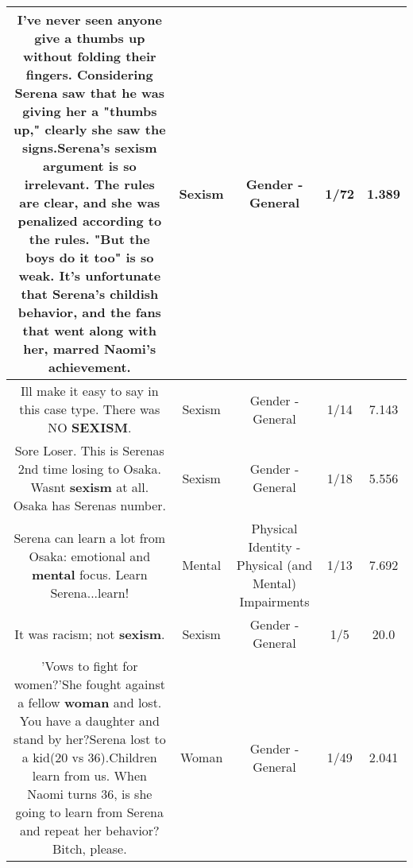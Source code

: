\documentclass[11pt]{article}
\newlength\mylength
\begin{document}
\begin{center}
\begin{longtable}{|C{.65\mylength}|C{.30\mylength}|C{.12\mylength}|C{.12\mylength}|C{.12\mylength}|}
  \small I've never seen anyone give a thumbs up without folding their fingers. Considering Serena saw that he was giving her a "thumbs up," clearly she saw the signs.Serena's \textbf{sexism} argument is so irrelevant. The rules are clear, and she was penalized according to the rules. "But the boys do it too" is so weak. It's unfortunate that Serena's childish behavior, and the fans that went along with her, marred Naomi's achievement.\normalsize   & Sexism & Gender - General & 1/72 & 1.389 \\  \hline
  \small Ill make it easy to say in this case type. There was NO \textbf{SEXISM}.\normalsize   & Sexism & Gender - General & 1/14 & 7.143 \\  \hline
  \small Sore Loser. This is Serenas 2nd time losing to Osaka. Wasnt \textbf{sexism} at all. Osaka has Serenas number.\normalsize   & Sexism & Gender - General & 1/18 & 5.556 \\  \hline
  \small Serena can learn a lot from Osaka: emotional and \textbf{mental} focus. Learn Serena...learn!\normalsize   & Mental & Physical Identity - Physical (and Mental) Impairments & 1/13 & 7.692 \\  \hline
  \small It was racism; not \textbf{sexism}.\normalsize   & Sexism & Gender - General & 1/5 & 20.0 \\  \hline
  \small 'Vows to fight for women?'She fought against a fellow \textbf{woman} and lost.  You have a daughter and stand by her?Serena lost to a kid(20 vs 36).Children learn from us.  When Naomi turns 36, is she going to learn from Serena and repeat her behavior?  Bitch, please.\normalsize   & Woman & Gender - General & 1/49 & 2.041 \\  \hline

\end{longtable}
\end{center}
\end{document}
